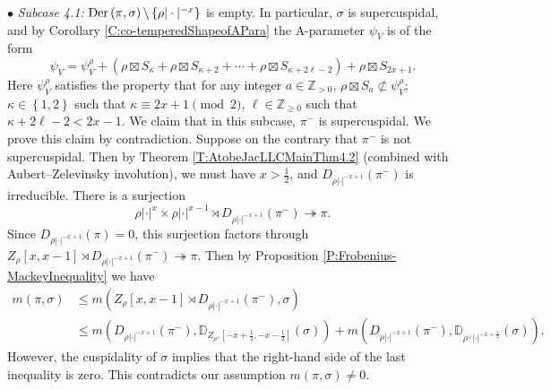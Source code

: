 \documentclass[11pt,letterpaper]{amsart}
\theoremstyle{plain}
\numberwithin{theorem}{section}
\numberwithin{equation}{subsection}
\theoremstyle{remark}
\newcommand{\D}{\mathbb{D}}
\newcommand{\Z}{\mathbb{Z}}
\def\Der{{\rm Der}} %
\begin{document}
$\bullet$\textit{ Subcase 4.1:} $\Der\left(\pi,\sigma\right)\backslash\left\{\rho|\cdot|^{-x}\right\}$ is empty. In particular, $\sigma$ is supercuspidal, and by Corollary \ref{C:co-temperedShapeofAPara} the A-parameter $\psi_V$ is of the form
\[
    \psi_V = \psi_V^{\rho} + \left(\rho\boxtimes S_{\kappa} + \rho\boxtimes S_{\kappa+2} + \cdots + \rho\boxtimes S_{\kappa + 2\ell-2}\right) + \rho\boxtimes S_{2x+1}.
\]
Here $\psi_V^{\rho}$ satisfies the property that for any integer $a\in\Z_{>0}$, $\rho\boxtimes S_a\not\subset \psi_V^\rho$; $\kappa\in\left\{1,2\right\}$ such that $\kappa\equiv 2x+1\pmod 2$, $\ell\in\Z_{\geq 0}$ such that $\kappa+2\ell-2<2x-1$. We claim that in this subcase, $\pi^-$ is supercuspidal. We prove this claim by contradiction. Suppose on the contrary that $\pi^-$ is not supercuspidal. Then by Theorem \ref{T:AtobeJacLLCMainThm4.2} (combined with Aubert--Zelevinsky involution), we must have $x>\frac{1}{2}$, and $D_{\rho|\cdot|^{-x+1}}\left(\pi^-\right)$ is irreducible. There is a surjection
\[
    \rho|\cdot|^{x}\times \rho|\cdot|^{x-1}\rtimes D_{\rho|\cdot|^{-x+1}}\left(\pi^-\right)\twoheadrightarrow \pi.
\]
Since $D_{\rho|\cdot|^{-x+1}}\left(\pi\right)=0$, this surjection factors through $Z_\rho\left[x,x-1\right]\rtimes D_{\rho|\cdot|^{-x+1}}\left(\pi^-\right)\twoheadrightarrow \pi$. Then by Proposition \ref{P:Frobenius-MackeyInequality} we have
\begin{align*}
    m\left(\pi,\sigma\right) &\leq m\left(Z_\rho\left[x,x-1\right]\rtimes D_{\rho|\cdot|^{-x+1}}\left(\pi^-\right),\sigma\right) \\
    &\leq m\left(D_{\rho|\cdot|^{-x+1}}\left(\pi^-\right),\D_{Z_{\rho^\vee}\left[-x+\frac{1}{2},-x-\frac{1}{2}\right]}\left(\sigma\right)\right) + m\left(D_{\rho|\cdot|^{-x+1}}\left(\pi^-\right), \D_{\rho^\vee|\cdot|^{-x+\frac{1}{2}}}\left(\sigma\right)\right).
\end{align*}
However, the cuspidality of $\sigma$ implies that the right-hand side of the last inequality is zero. This contradicts our assumption $m\left(\pi,\sigma\right)\neq0$.

\vskip 5pt
\end{document}
